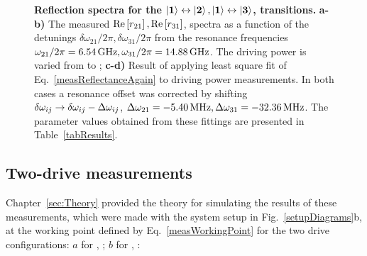   \begin{figure}
  	\caption{\small\textbf{Reflection spectra for the $ \mathbf{\ket{1}\leftrightarrow\ket{2}, \ket{1}\leftrightarrow\ket{3}} $, transitions.} \textbf{a-b)} The measured $\text{Re}\left[r_{21}\right], \text{Re}\left[r_{31}\right] $, spectra as a function of the detunings $ \delta\omega_{21}/2\pi, \delta\omega_{31}/2\pi$ from the resonance frequencies $ \omega_{21}/2\pi =  6.54\,\text{GHz}, \omega_{31}/2\pi =  14.88\,\text{GHz}$. The driving power is varied from  to ; \textbf{c-d)} Result of applying least square fit of Eq.~\eqref{measReflectanceAgain} to  driving power measurements. In both cases a resonance offset was corrected by shifting $ \delta\omega_{ij}\rightarrow\delta\omega_{ij}-\Delta\omega_{ij} $, $ \Delta\omega_{21}=-5.40\,\text{MHz}, \Delta\omega_{31}=-32.36\,\text{MHz} $. The parameter values obtained from these fittings are presented in Table~\ref{tabResults}.}
  	\label{measTransmissionForDifferentPowers}
  \end{figure}
 
 \subsection{Two-drive measurements\label{subsec:TwoDriveMeas}}
  Chapter~\ref{sec:Theory} provided the theory for simulating the results of these measurements, which were made with the system setup in Fig.~\ref{setupDiagrams}b, at the working point defined by Eq.~\eqref{measWorkingPoint} for the two drive configurations: $ a $ for \lra{}, \lra{}; $ b $ for \lra{}, \lra{}:
  
